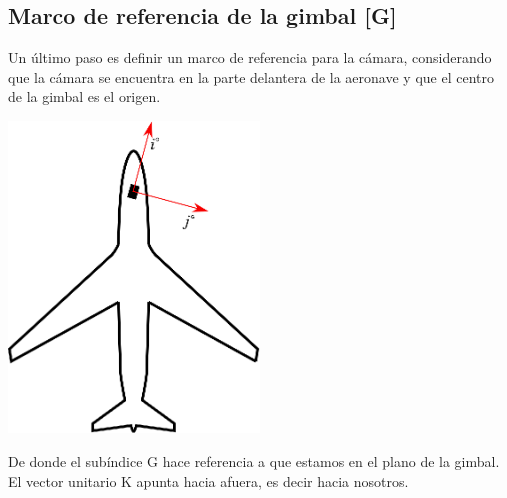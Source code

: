 \subsection{Marco de referencia de la gimbal [G]}
Un último paso es definir un marco de referencia para la cámara, considerando que la cámara se encuentra en la parte delantera de
la aeronave y que el centro de la gimbal es el origen.
\begin{center}
	\includegraphics[width=0.5\textwidth]{Contenido/Cuerpo/Capitulo3/Fig7.eps}
	\label{fig:ModeloMat:Fig1}
\end{center}
De donde el subíndice G hace referencia a que estamos en el plano de la gimbal. El vector unitario K apunta hacia afuera,
es decir hacia nosotros.


